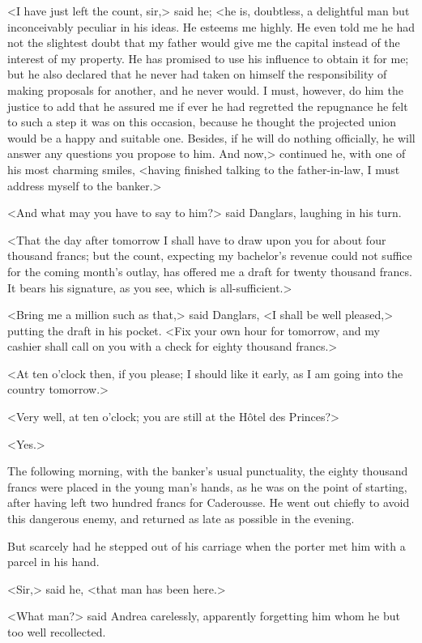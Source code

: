 <I have just left the count, sir,> said he; <he is, doubtless, a delightful man but inconceivably peculiar in his ideas. He esteems me highly. He even told me he had not the slightest doubt that my father would give me the capital instead of the interest of my property. He has promised to use his influence to obtain it for me; but he also declared that he never had taken on himself the responsibility of making proposals for another, and he never would. I must, however, do him the justice to add that he assured me if ever he had regretted the repugnance he felt to such a step it was on this occasion, because he thought the projected union would be a happy and suitable one. Besides, if he will do nothing officially, he will answer any questions you propose to him. And now,> continued he, with one of his most charming smiles, <having finished talking to the father-in-law, I must address myself to the banker.> 

 <And what may you have to say to him?> said Danglars, laughing in his turn. 

 <That the day after tomorrow I shall have to draw upon you for about four thousand francs; but the count, expecting my bachelor's revenue could not suffice for the coming month's outlay, has offered me a draft for twenty thousand francs. It bears his signature, as you see, which is all-sufficient.> 

 <Bring me a million such as that,> said Danglars, <I shall be well pleased,> putting the draft in his pocket. <Fix your own hour for tomorrow, and my cashier shall call on you with a check for eighty thousand francs.> 

 <At ten o'clock then, if you please; I should like it early, as I am going into the country tomorrow.> 

 <Very well, at ten o'clock; you are still at the Hôtel des Princes?> 

 <Yes.> 

 The following morning, with the banker's usual punctuality, the eighty thousand francs were placed in the young man's hands, as he was on the point of starting, after having left two hundred francs for Caderousse. He went out chiefly to avoid this dangerous enemy, and returned as late as possible in the evening. 

 But scarcely had he stepped out of his carriage when the porter met him with a parcel in his hand. 

 <Sir,> said he, <that man has been here.> 

 <What man?> said Andrea carelessly, apparently forgetting him whom he but too well recollected. 

